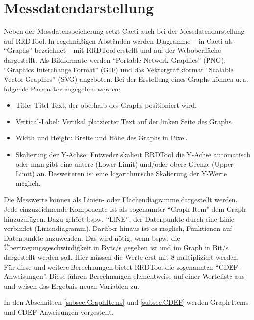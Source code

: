 \documentclass[12pt,ngerman,toc=listofnumbered,toc=bibliographynumbered,toc=index,headsepline=true]{scrbook}
\begin{document}
\chapter{Messdatendarstellung}
Neben der Messdatenspeicherung setzt Cacti auch bei der Messdatendarstellung auf
RRDTool. In regelmäßigen Abständen werden Diagramme -- in Cacti als
\enquote{Graphs} bezeichnet -- mit RRDTool erstellt und auf der Weboberfläche
dargestellt. Als Bildformate werden \enquote{Portable Network Graphics} (PNG),
\enquote{Graphics Interchange Format} (GIF) und das Vektorgrafikformat
\enquote{Scalable Vector Graphics} (SVG) angeboten. Bei der Erstellung eines
Graphs können u.\,a. folgende Parameter angegeben werden:
\begin{itemize}
  \item Title: Titel-Text, der oberhalb des Graphs positioniert wird.
  \item Vertical-Label: Vertikal platzierter Text auf der linken Seite des
  Graphs.
  \item Width und Height: Breite und Höhe des Graphs in Pixel.
  \item Skalierung der Y-Achse: Entweder skaliert RRDTool die Y-Achse
  automatisch oder man gibt eine untere (Lower-Limit) und/oder obere Grenze
  (Upper-Limit) an. Desweiteren ist eine logarithmische Skalierung der Y-Werte
  möglich.
\end{itemize}
Die Messwerte können als Linien- oder Flächendiagramme dargestellt werden. Jede
einzuzeichnende Komponente ist als sogenannter \enquote{Graph-Item} dem Graph
hinzuzufügen. Dazu gehört bspw. \enquote{LINE}, der Datenpunkte durch eine
Linie verbindet (Liniendiagramm). Darüber hinaus ist es möglich, Funktionen
auf Datenpunkte anzuwenden. Das wird nötig, wenn bspw. die
Übertragungsgeschwindigkeit in Byte/s gegeben ist und im Graph in Bit/s
dargestellt werden soll. Hier müssen die Werte erst mit 8 multipliziert werden.
Für diese und weitere Berechnungen bietet RRDTool die sogenannten
\enquote{CDEF-Anweisungen}. Diese führen Berechnungen elementweise auf
einer Werteliste aus und weisen das Ergebnis neuen Variablen zu.

In den Abschnitten \ref{subsec:GraphItems} und \ref{subsec:CDEF}
werden Graph-Items und CDEF-Anweisungen vorgestellt.
\end{document}
